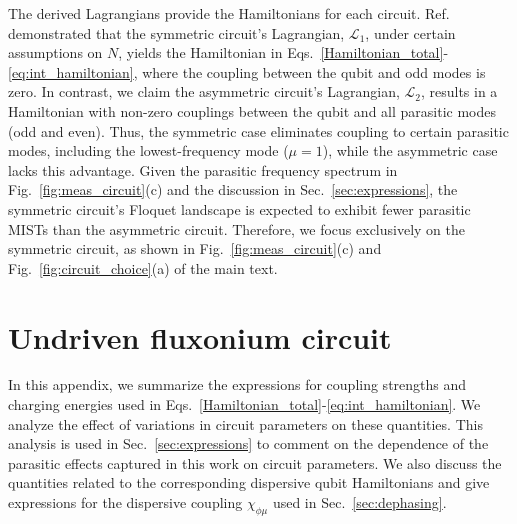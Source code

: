 \documentclass[%
reprint,
superscriptaddress,
 amsmath,amssymb,
 aps,
 prx,
longbibliography,
floatfix,
]{revtex4-2}
\begin{document}
The derived Lagrangians provide the Hamiltonians for each circuit. Ref.~\cite{viola2015collective} demonstrated that the symmetric circuit's Lagrangian, \( \mathcal{L}_1 \), under certain assumptions on \( N \), yields the Hamiltonian in Eqs.~\ref{Hamiltonian_total}-\ref{eq:int_hamiltonian}, where the coupling between the qubit and odd modes is zero. In contrast, we claim the asymmetric circuit's Lagrangian, \( \mathcal{L}_2 \), results in a Hamiltonian with non-zero couplings between the qubit and all parasitic modes (odd and even). Thus, the symmetric case eliminates coupling to certain parasitic modes, including the lowest-frequency mode (\( \mu = 1 \)), while the asymmetric case lacks this advantage. Given the parasitic frequency spectrum in Fig.~\ref{fig:meas_circuit}(c) and the discussion in Sec.~\ref{sec:expressions}, the symmetric circuit's Floquet landscape is expected to exhibit fewer parasitic MISTs than the asymmetric circuit. Therefore, we focus exclusively on the symmetric circuit, as shown in Fig.~\ref{fig:meas_circuit}(c) and Fig.~\ref{fig:circuit_choice}(a) of the main text.

\section{Undriven fluxonium circuit}\label{app:Hamiltonian}
In this appendix, we summarize the expressions for coupling strengths and charging energies used in Eqs.~\ref{Hamiltonian_total}-\ref{eq:int_hamiltonian}. We analyze the effect of variations in circuit parameters on these quantities. This analysis is used in Sec.~\ref{sec:expressions} to comment on the dependence of the parasitic effects captured in this work on circuit parameters. We also discuss the quantities related to the corresponding dispersive qubit Hamiltonians and give expressions for the dispersive coupling $\chi_{\phi\mu}$ used in Sec.~\ref{sec:dephasing}.
\end{document}
